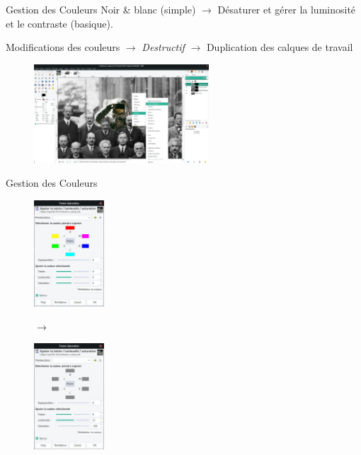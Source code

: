 \documentclass[10pt,svgnames,usenames,table]{beamer}
\begin{document}
	\begin{frame}{Gestion des Couleurs}
		Noir \& blanc (simple) $\rightarrow$ Désaturer et gérer la luminosité et le contraste (basique).
		
		Modifications des couleurs $\rightarrow$ \emph{Destructif} $\rightarrow$ Duplication des calques de travail

		\begin{figure}
			\centering
			\includegraphics[height=140px]{Images/colours/col2} 
		\end{figure}
	\end{frame}
	
	\begin{frame}{Gestion des Couleurs}
	
		\begin{figure}[H]
			\centering
			\begin{minipage}{.5\textwidth}
				\centering
				\includegraphics[height=150px]{Images/colours/col3} 
				\end{minipage}$\rightarrow$%
			\begin{minipage}{.5\textwidth}
				\centering
				\includegraphics[height=150px]{Images/colours/col4} 
				\end{minipage}
			\end{figure}		
	\end{frame}	
	
\end{document}

